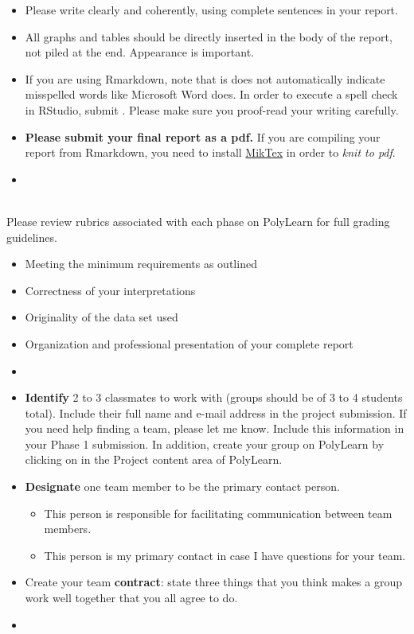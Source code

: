 \documentclass[letterpaper,12pt]{report}
\begin{document}
\begin{itemize}
\item Please write clearly and coherently, using complete sentences in your report.
\item  All graphs and tables should be directly inserted in the body of the report, not piled at the end. Appearance is important.
  \item If you are using Rmarkdown, note that is does not automatically indicate misspelled words like Microsoft Word does.  In order to execute a spell check in RStudio, submit . Please make sure you proof-read your writing carefully.
  \item \textbf{Please submit your final report as a pdf.}  If you are compiling your report from Rmarkdown, you need to install \href{https://miktex.org/}{MikTex} in order to \emph{knit to pdf}.
\item[]
\end{itemize}

\\
\vskip3pt
Please review rubrics associated with each phase on PolyLearn for full grading guidelines.
\begin{itemize}
\item Meeting the minimum requirements as outlined
\item Correctness of your interpretations
\item Originality of the data set used
\item Organization and professional presentation of your complete report
\item[]
\end{itemize}

{}
\begin{itemize}
    \item \textbf{Identify} 2 to 3 classmates to work with (groups should be of 3 to 4 students total).  Include their full name and e-mail address in the project submission.  If you need help finding a team, please let me know.  Include this information in your Phase 1 submission.  In addition, create  your group on PolyLearn by clicking on  in the Project content area of PolyLearn.
    \item \textbf{Designate} one team member to be the primary contact person.
    \begin{itemize}
        \item This person is responsible for facilitating communication between team members.
        \item This person is my primary contact in case I have questions for your team.
    \end{itemize}
    \item Create your team \textbf{contract}: state three things that you think makes a group work well together that you all agree to do.
    \item[]
\end{itemize}
\end{document}

